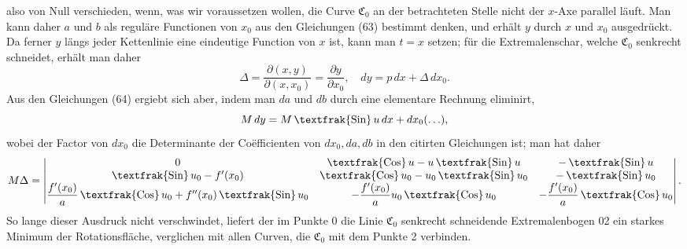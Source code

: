 \documentclass[11pt,a4paper,leqno]{article}
\newcommand{\Cof}{\mathop{\text{\textfrak{Cos}}}\nolimits}
\newcommand{\Sin}{\mathop{\text{\textfrak{Sin}}}\nolimits}
\begin{document}
also von Null verschieden, wenn, was wir voraussetzen wollen, die Curve $\mathfrak{C}_0$ an der betrachteten Stelle nicht der $x$-Axe parallel läuft. Man kann daher $a$ und $b$ als reguläre Functionen von $x_0$ aus den Gleichungen (63) bestimmt denken, und erhält $y$ durch $x$ und $x_0$ ausgedrückt. Da ferner $y$ längs jeder Kettenlinie eine eindeutige Function von $x$ ist, kann man $t=x$ setzen; für die Extremalenschar, welche $\mathfrak{C}_0$ senkrecht schneidet, erhält man daher
\[
\Delta=\frac{\partial(x,y)}{\partial(x,x_0)}=\frac{\partial y}{\partial x_0},\quad
dy=p\,dx+\Delta\,dx_0.
\]
Aus den Gleichungen (64) ergiebt sich aber, indem man $da$ und $db$ durch eine elementare Rechnung eliminirt,
\[
M\,dy=M\Sin u\,dx+dx_0(\ldots),
\]
wobei der Factor von $dx_0$ die Determinante der Coëfficienten von $dx_0,da,db$ in den citirten Gleichungen ist; man hat daher
\[
M\Delta=
\begin{vmatrix}
0 & \Cof u-u\Sin u & -\Sin u\\
\Sin u_0-f'(x_0) & \Cof u_0-u_0\Sin u_0 & -\Sin u_0\\
\dfrac{f'(x_0)}{a}\Cof u_0+f''(x_0)\Sin u_0 &
-\dfrac{f'(x_0)}{a}u_0\Cof u_0 &
-\dfrac{f'(x_0)}{a}\Cof u_0
\end{vmatrix}.
\]
So lange dieser Ausdruck nicht verschwindet, liefert der im Punkte 0 die Linie $\mathfrak{C}_0$ senkrecht schneidende Extremalenbogen 02 ein starkes Minimum der Rotationsfläche, verglichen mit allen Curven, die $\mathfrak{C}_0$ mit dem Punkte 2 verbinden.
\end{document}
